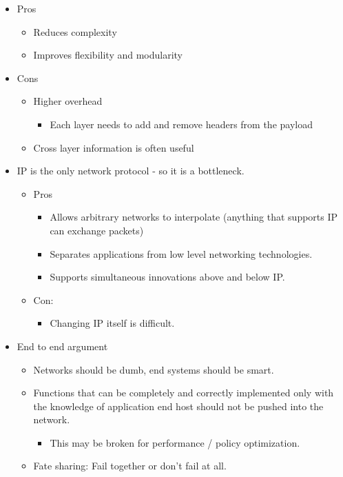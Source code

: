 \begin{itemize}
\tightlist
\item
  Pros

  \begin{itemize}
  \tightlist
  \item
    Reduces complexity
  \item
    Improves flexibility and modularity
  \end{itemize}
\item
  Cons

  \begin{itemize}
  \tightlist
  \item
    Higher overhead

    \begin{itemize}
    \tightlist
    \item
      Each layer needs to add and remove headers from the payload
    \end{itemize}
  \item
    Cross layer information is often useful
  \end{itemize}
\item
  IP is the only network protocol - so it is a bottleneck.

  \begin{itemize}
  \tightlist
  \item
    Pros

    \begin{itemize}
    \tightlist
    \item
      Allows arbitrary networks to interpolate (anything that supports
      IP can exchange packets)
    \item
      Separates applications from low level networking technologies.
    \item
      Supports simultaneous innovations above and below IP.
    \end{itemize}
  \item
    Con:

    \begin{itemize}
    \tightlist
    \item
      Changing IP itself is difficult.
    \end{itemize}
  \end{itemize}
\item
  End to end argument

  \begin{itemize}
  \tightlist
  \item
    Networks should be dumb, end systems should be smart.
  \item
    Functions that can be completely and correctly implemented only with
    the knowledge of application end host should not be pushed into the
    network.

    \begin{itemize}
    \tightlist
    \item
      This may be broken for performance / policy optimization.
    \end{itemize}
  \item
    Fate sharing: Fail together or don't fail at all.
  \end{itemize}
\end{itemize}

